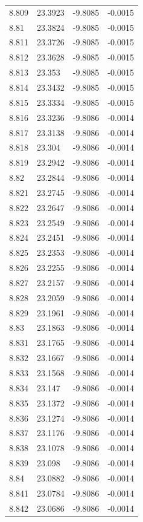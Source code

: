 \begin{tabular}{llll}
8.809 & 23.3923 & -9.8085 & -0.0015 \\
8.81 & 23.3824 & -9.8085 & -0.0015 \\
8.811 & 23.3726 & -9.8085 & -0.0015 \\
8.812 & 23.3628 & -9.8085 & -0.0015 \\
8.813 & 23.353 & -9.8085 & -0.0015 \\
8.814 & 23.3432 & -9.8085 & -0.0015 \\
8.815 & 23.3334 & -9.8085 & -0.0015 \\
8.816 & 23.3236 & -9.8086 & -0.0014 \\
8.817 & 23.3138 & -9.8086 & -0.0014 \\
8.818 & 23.304 & -9.8086 & -0.0014 \\
8.819 & 23.2942 & -9.8086 & -0.0014 \\
8.82 & 23.2844 & -9.8086 & -0.0014 \\
8.821 & 23.2745 & -9.8086 & -0.0014 \\
8.822 & 23.2647 & -9.8086 & -0.0014 \\
8.823 & 23.2549 & -9.8086 & -0.0014 \\
8.824 & 23.2451 & -9.8086 & -0.0014 \\
8.825 & 23.2353 & -9.8086 & -0.0014 \\
8.826 & 23.2255 & -9.8086 & -0.0014 \\
8.827 & 23.2157 & -9.8086 & -0.0014 \\
8.828 & 23.2059 & -9.8086 & -0.0014 \\
8.829 & 23.1961 & -9.8086 & -0.0014 \\
8.83 & 23.1863 & -9.8086 & -0.0014 \\
8.831 & 23.1765 & -9.8086 & -0.0014 \\
8.832 & 23.1667 & -9.8086 & -0.0014 \\
8.833 & 23.1568 & -9.8086 & -0.0014 \\
8.834 & 23.147 & -9.8086 & -0.0014 \\
8.835 & 23.1372 & -9.8086 & -0.0014 \\
8.836 & 23.1274 & -9.8086 & -0.0014 \\
8.837 & 23.1176 & -9.8086 & -0.0014 \\
8.838 & 23.1078 & -9.8086 & -0.0014 \\
8.839 & 23.098 & -9.8086 & -0.0014 \\
8.84 & 23.0882 & -9.8086 & -0.0014 \\
8.841 & 23.0784 & -9.8086 & -0.0014 \\
8.842 & 23.0686 & -9.8086 & -0.0014 \\

\end{tabular}
